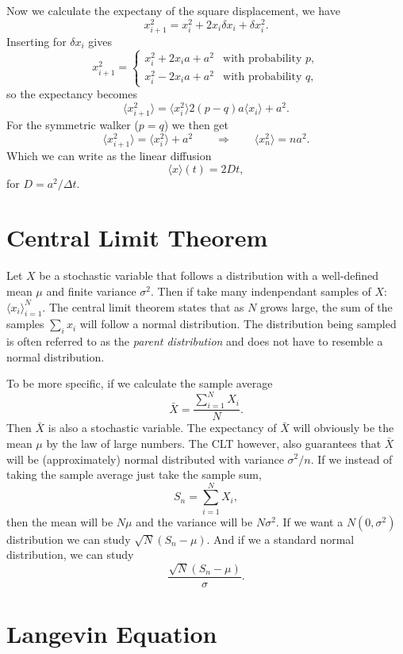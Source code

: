 \documentclass[a4paper, 11pt, notitlepage, english]{article}
\newcommand{\To}{\quad\Rightarrow\quad}
\begin{document}
Now we calculate the expectany of the square displacement, we have
$$x_{i+1}^2 = x_{i}^2 + 2x_i\delta x_i + \delta x_i^2.$$
Inserting for $\delta x_i$ gives
$$x_{i+1}^2 = \begin{cases}
	x_i^2 + 2x_ia + a^2 & \mbox{with probability } p, \\
	x_i^2 - 2x_ia + a^2 & \mbox{with probability } q,
\end{cases}$$
so the expectancy becomes
$$\langle x_{i+1}^2 \rangle = \langle x_i^2 \rangle 2(p-q)a \langle x_i \rangle + a^2.$$
For the symmetric walker ($p=q$) we then get
$$\langle x_{i+1}^2 \rangle = \langle x_i^2 \rangle + a^2 \quad \To \quad \langle x_n^2 \rangle = na^2.$$
Which we can write as the linear diffusion
$$\langle x \rangle(t) = 2Dt,$$
for $D = a^2/\Delta t$.

\clearpage

\section*{Central Limit Theorem}

Let $X$ be a stochastic variable that follows a distribution with a well-defined mean $\mu$ and finite variance $\sigma^2$. Then if take many indenpendant samples of $X$: $\langle x_i \rangle_{i=1}^{N}$. The central limit theorem states that as $N$ grows large, the sum of the samples $\sum_i x_i$ will follow a normal distribution. The distribution being sampled is often referred to as the \emph{parent distribution} and does not have to resemble a normal distribution.

To be more specific, if we calculate the sample average
$$\bar{X} = \frac{\sum_{i=1}^N X_i}{N}.$$
Then $\bar{X}$ is also a stochastic variable. The expectancy of $\bar{X}$ will obviously be the mean $\mu$ by the law of large numbers. The CLT however, also guarantees that $\bar{X}$ will be (approximately) normal distributed with variance $\sigma^2/n$. If we instead of taking the sample average just take the sample sum, 
$$S_n = \sum_{i=1}^N X_i,$$
then the mean will be $N\mu$ and the variance will be $N\sigma^2$. If we want a $N(0, \sigma^2)$ distribution we can study $\sqrt{N}(S_n - \mu)$. And if we a standard normal distribution, we can study
$$\frac{\sqrt{N}(S_n - \mu)}{\sigma}.$$

\clearpage

\section*{Langevin Equation}
\end{document}
